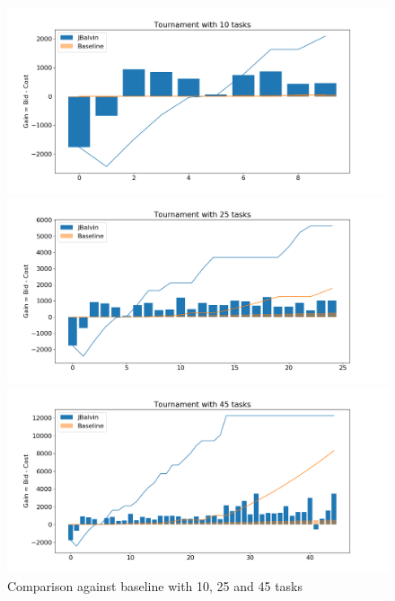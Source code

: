 \documentclass[11pt]{article}
\begin{document}
\begin{figure}[ht]
    \centering
\begin{minipage}[]{0.3\textwidth}
\includegraphics[width=\textwidth]{plots/baseline_10.png}
\end{minipage}
\begin{minipage}[]{0.3\textwidth}
\includegraphics[width=\textwidth]{plots/baseline_25.png}
\end{minipage}
\begin{minipage}[]{0.3\textwidth}
\includegraphics[width=\textwidth]{plots/baseline_45.png}
\end{minipage}
\caption{Comparison against baseline with 10, 25 and 45 tasks}
\label{fig:baseline}
\end{figure}
\end{document}
